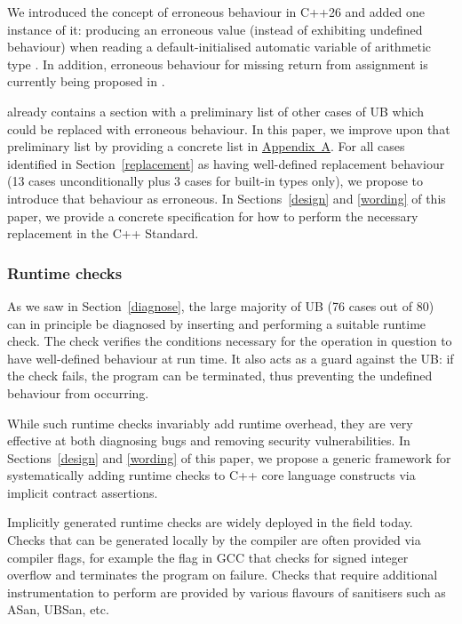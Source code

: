 We introduced the concept of erroneous behaviour in C++26 and added one instance of it: producing an erroneous value (instead of exhibiting undefined behaviour) when reading a default-initialised automatic variable of arithmetic type \cite{P2795R5}. In addition, erroneous behaviour for missing return from assignment is currently being proposed in \cite{P2973R0}.

\cite{P2795R5} already contains a section with a preliminary list of other cases of UB which could be replaced with erroneous behaviour. In this paper, we improve upon that preliminary list by providing a concrete list in \hyperref[appendix]{Appendix~A}. For all cases identified in Section~\ref{replacement} as having well-defined replacement behaviour (13 cases unconditionally plus 3 cases for built-in types only), we propose to introduce that behaviour as erroneous. In Sections~\ref{design} and \ref{wording} of this paper, we provide a concrete specification for how to perform the necessary replacement in the C++ Standard.

\subsubsection{Runtime checks}
\label{checks}

As we saw in Section~\ref{diagnose}, the large majority of UB (76 cases out of 80) can in principle be diagnosed by inserting and performing a suitable runtime check. The check verifies the conditions necessary for the operation in question to have well-defined behaviour at run time. It also acts as a guard against the UB: if the check fails, the program can be terminated, thus preventing the undefined behaviour from occurring.

While such runtime checks invariably add runtime overhead, they are very effective at both diagnosing bugs and removing security vulnerabilities. In Sections~\ref{design} and \ref{wording} of this paper, we propose a generic framework for systematically adding runtime checks to C++ core language constructs via implicit contract assertions.

Implicitly generated runtime checks are widely deployed in the field today. Checks that can be generated locally by the compiler are often provided via compiler flags, for example the  flag in GCC that checks for signed integer overflow and terminates the program on failure. Checks that require additional instrumentation to perform are provided by various flavours of sanitisers such as ASan, UBSan, etc.

